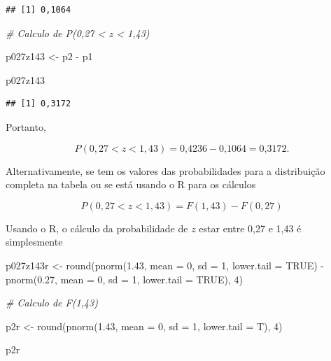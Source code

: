 \documentclass[
]{book}
\newenvironment{Shaded}{\begin{snugshade}}{\end{snugshade}}
\newcommand{\AttributeTok}[1]{\textcolor[rgb]{0.77,0.63,0.00}{#1}}
\newcommand{\CommentTok}[1]{\textcolor[rgb]{0.56,0.35,0.01}{\textit{#1}}}
\newcommand{\ConstantTok}[1]{\textcolor[rgb]{0.00,0.00,0.00}{#1}}
\newcommand{\DecValTok}[1]{\textcolor[rgb]{0.00,0.00,0.81}{#1}}
\newcommand{\FloatTok}[1]{\textcolor[rgb]{0.00,0.00,0.81}{#1}}
\newcommand{\FunctionTok}[1]{\textcolor[rgb]{0.00,0.00,0.00}{#1}}
\newcommand{\NormalTok}[1]{#1}
\newcommand{\OtherTok}[1]{\textcolor[rgb]{0.56,0.35,0.01}{#1}}
\newcommand{\SpecialCharTok}[1]{\textcolor[rgb]{0.00,0.00,0.00}{#1}}
\begin{document}
\begin{verbatim}
## [1] 0,1064
\end{verbatim}

\begin{Shaded}
\begin{Highlighting}[]
\CommentTok{\# Calculo de P(0,27 \textless{} z \textless{} 1,43)}

\NormalTok{p027z143 }\OtherTok{\textless{}{-}}\NormalTok{ p2 }\SpecialCharTok{{-}}\NormalTok{ p1}

\NormalTok{p027z143}
\end{Highlighting}
\end{Shaded}

\begin{verbatim}
## [1] 0,3172
\end{verbatim}

Portanto,

\[
  P(0,27 < z < 1,43) = \text{0,4236} - \text{0,1064} = \text{0,3172}.
\]

Alternativamente, se tem os valores das probabilidades para a distribuição completa na tabela ou se está usando o R para os cálculos

\[
  P(0,27 < z < 1,43) = F(1,43) - F(0,27)
\]

Usando o R, o cálculo da probabilidade de \(z\) estar entre 0,27 e 1,43 é simplesmente

\begin{Shaded}
\begin{Highlighting}[]
\NormalTok{p027z143r }\OtherTok{\textless{}{-}} \FunctionTok{round}\NormalTok{(}\FunctionTok{pnorm}\NormalTok{(}\FloatTok{1.43}\NormalTok{, }\AttributeTok{mean =} \DecValTok{0}\NormalTok{, }\AttributeTok{sd =} \DecValTok{1}\NormalTok{, }\AttributeTok{lower.tail =} \ConstantTok{TRUE}\NormalTok{) }\SpecialCharTok{{-}} 
    \FunctionTok{pnorm}\NormalTok{(}\FloatTok{0.27}\NormalTok{, }\AttributeTok{mean =} \DecValTok{0}\NormalTok{, }\AttributeTok{sd =} \DecValTok{1}\NormalTok{, }\AttributeTok{lower.tail =} \ConstantTok{TRUE}\NormalTok{), }
    \DecValTok{4}\NormalTok{)}

\CommentTok{\# Calculo de F(1,43)}

\NormalTok{p2r }\OtherTok{\textless{}{-}} \FunctionTok{round}\NormalTok{(}\FunctionTok{pnorm}\NormalTok{(}\FloatTok{1.43}\NormalTok{, }\AttributeTok{mean =} \DecValTok{0}\NormalTok{, }\AttributeTok{sd =} \DecValTok{1}\NormalTok{, }\AttributeTok{lower.tail =}\NormalTok{ T), }
    \DecValTok{4}\NormalTok{)}

\NormalTok{p2r}
\end{Highlighting}
\end{Shaded}
\end{document}
